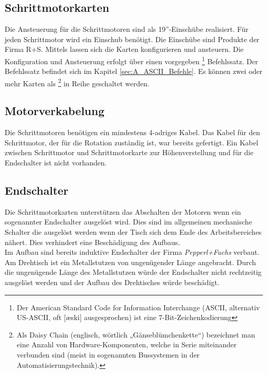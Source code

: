 \subsection{Schrittmotorkarten}
\label{sec:Schrittmotorkarten}
Die Ansteuerung für die Schrittmotoren sind als 19''-Einschübe realisiert. Für jeden Schrittmotor wird ein Einschub benötigt.
Die Einschübe sind Produkte der Firma R+S. Mittels  lassen sich die Karten konfigurieren und ansteuern. Die Konfiguration und Ansteuerung erfolgt über einen vorgegeben 
\footnote{Der American Standard Code for Information Interchange (ASCII, alternativ US-ASCII, oft [æski] ausgesprochen) ist eine 7-Bit-Zeichenkodierung\cite{wiki:ASCII}}
 Befehlssatz. Der Befehlssatz befindet sich im Kapitel \ref{sec:A_ASCII_Befehle}. Es können zwei oder mehr Karten als 
\footnote{Als Daisy Chain (englisch, wörtlich „Gänseblümchenkette“) bezeichnet man eine Anzahl von Hardware-Komponenten, welche in Serie miteinander verbunden sind (meist in sogenannten Bussystemen in der Automatisierungstechnik).\cite{wiki:Daisy} } 
in Reihe geschaltet werden.
\subsection{Motorverkabelung}
\label{sec:Motorverkabelung}
Die Schrittmotoren benötigen ein mindestens 4-adriges Kabel. Das Kabel für den Schrittmotor, der für die Rotation zuständig ist, war bereits gefertigt. Ein Kabel zwischen Schrittmotor und Schrittmotorkarte zur Höhenverstellung und für die Endschalter ist nicht vorhanden. 


\subsection{Endschalter}
\label{sec:Endschalter}
Die Schrittmotorkarten unterstützen das Abschalten der Motoren wenn ein sogenannter Endschalter ausgelöst wird. Dies sind im allgemeinen mechanische Schalter die ausgelöst werden wenn der Tisch sich dem Ende des Arbeitsbereiches nähert. Dies verhindert eine Beschädigung des Aufbaus.\\
Im Aufbau sind bereits induktive Endschalter der Firma \textit{Pepperl+Fuchs} verbaut. 
Am Drehtisch ist ein Metallstutzen von ungenügender Länge angebracht. Durch die ungenügende Länge des Metallstutzen würde der Endschalter nicht rechtzeitig ausgelöst werden und der Aufbau des Drehtisches würde beschädigt.


